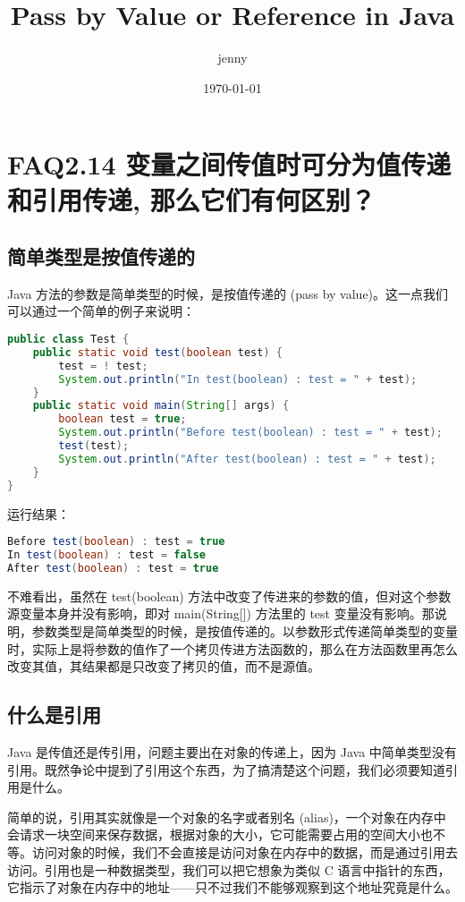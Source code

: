 \documentclass[10pt,b5paper]{article}
\author{jenny}
\date{\today}
\title{Pass by Value or Reference in Java}
\begin{document}
\maketitle
\tableofcontents


\section{FAQ2.14 变量之间传值时可分为值传递和引用传递, 那么它们有何区别？}
\label{sec-1}
\small{}

\subsection{简单类型是按值传递的}
\label{sec-1-1}

Java 方法的参数是简单类型的时候，是按值传递的 (pass by value)。这一点我们可以通过一个简单的例子来说明：
\begin{lstlisting}[language=java]
public class Test { 
    public static void test(boolean test) { 
        test = ! test; 
        System.out.println("In test(boolean) : test = " + test); 
    } 
    public static void main(String[] args) { 
        boolean test = true; 
        System.out.println("Before test(boolean) : test = " + test); 
        test(test); 
        System.out.println("After test(boolean) : test = " + test); 
    } 
}
\end{lstlisting}
运行结果：
\begin{lstlisting}[language=java]
Before test(boolean) : test = true 
In test(boolean) : test = false 
After test(boolean) : test = true
\end{lstlisting}

不难看出，虽然在 test(boolean) 方法中改变了传进来的参数的值，但对这个参数源变量本身并没有影响，即对 main(String[]) 方法里的 test 变量没有影响。那说明，参数类型是简单类型的时候，是按值传递的。以参数形式传递简单类型的变量时，实际上是将参数的值作了一个拷贝传进方法函数的，那么在方法函数里再怎么改变其值，其结果都是只改变了拷贝的值，而不是源值。
\subsection{什么是引用}
\label{sec-1-2}

Java 是传值还是传引用，问题主要出在对象的传递上，因为 Java 中简单类型没有引用。既然争论中提到了引用这个东西，为了搞清楚这个问题，我们必须要知道引用是什么。

简单的说，引用其实就像是一个对象的名字或者别名 (alias)，一个对象在内存中会请求一块空间来保存数据，根据对象的大小，它可能需要占用的空间大小也不等。访问对象的时候，我们不会直接是访问对象在内存中的数据，而是通过引用去访问。引用也是一种数据类型，我们可以把它想象为类似 C 语言中指针的东西，它指示了对象在内存中的地址——只不过我们不能够观察到这个地址究竟是什么。
\end{document}
